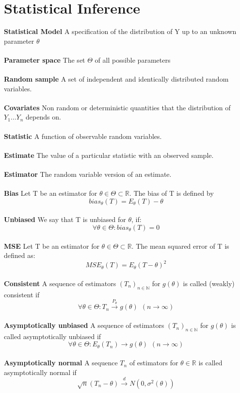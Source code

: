 \documentclass{article}
\begin{document}
\section{Statistical Inference}
\textbf{Statistical Model}
A specification of the distribution of Y up to an unknown parameter $\theta$ 
\\
\\
\textbf{Parameter space}
The set $\Theta$ of all possible parameters
\\
\\
\textbf{Random sample}
A set of independent and identically distributed random variables.
\\
\\
\textbf{Covariates}
Non random or deterministic quantities that the distribution of $Y_1 ... Y_n$ depends on.
\\
\\
\textbf{Statistic}
A function of observable random variables.
\\
\\
\textbf{Estimate}
The value of a particular statistic with an observed sample.
\\
\\
\textbf{Estimator}
The random variable version of an estimate.
\\
\\
\textbf{Bias}
 Let T be an estimator for $ \theta \in \Theta \subset \mathbb{R} $. The bias of T is defined by $$bias_\theta(T) = E_\theta(T) - \theta$$
 \\
\textbf{Unbiased}
 We say that T is unbiased for $\theta$, if: $$\forall \theta \in \Theta: bias_\theta(T)=0$$ \\
\textbf{MSE}
Let T be an estimator for $ \theta \in \Theta \subset \mathbb{R} $. The mean squared error of T is defined as:
$$MSE_\theta(T) = E_\theta(T - \theta)^2$$
\\
\textbf{Consistent}
A sequence of estimators $(T_n)_{n \in \mathbb{N}}$ for $g(\theta)$ is called (weakly) consistent if $$\forall \theta \in \Theta: T_n \overset{P_\theta}{\to }
 g(\theta) \hspace{5pt}(n \to \infty)$$
\\
\textbf{Asymptotically unbiased}
A sequence of estimators $(T_n)_{n \in \mathbb{N}}$ for $g(\theta)$ is called asymptotically unbiased if $$\forall \theta \in \Theta:
E_\theta(T_n) \to g(\theta) \hspace{5pt}(n \to \infty)$$
\\
\textbf{Asymptotically normal}
A sequence $T_n$ of estimators for $\theta \in \mathbb{R}$ is called asymptotically normal if $$\sqrt{n}(T_n - \theta)\overset{d}{\to} N(0,\sigma^2(\theta))$$
\end{document}
